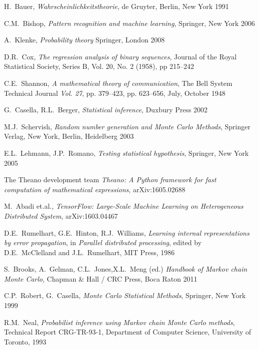 \documentclass[a4paper, draft]{report}
\numberwithin{section}{chapter}
\numberwithin{equation}{chapter}
\theoremstyle{own}
\theoremstyle{remark}
\begin{document}

\begin{thebibliography}{9}
	
H.~Bauer,
{\em Wahrscheinlichkeitstheorie},
de Gruyter, Berlin, New York 1991
	

C.M.~Bishop, 
{\em Pattern recognition and machine learning},
Springer, New York 2006

A.~Klenke,
{\em Probability theory}
Springer, London 2008


D.R.~Cox,
{\em The regression analysis of binary sequences},
Journal of the Royal Statistical Society, Series B, Vol. 20, No. 2 (1958), pp 215--242

C.E.~Shannon,
{\em A mathematical theory of communication}, 
The Bell System Technical Journal {\em Vol. 27}, pp. 379--423, pp. 623--656, July, October 1948


G.~Casella, R.L.~Berger,
{\em Statistical inference},
Duxbury Press 2002

M.J.~Schervish,
{\em Random number generation and Monte Carlo Methods},
Springer Verlag, New York, Berlin, Heidelberg 2003

E.L.~Lehmann, J.P.~Romano,
{\em Testing statistical hypothesis},
Springer, New York 2005

The Theano development team
{\em Theano: A Python framework for fast computation of mathematical expressions},
arXiv:1605.02688

M.~Abadi et.al.,
{\em TensorFlow: Large-Scale Machine Learning on Heterogeneous Distributed System},
arXiv:1603.04467

D.E.~Rumelhart, G.E.~Hinton, R.J.~Williams,
{\em Learning internal representations by error propagation}, in
{\em Parallel distributed processing}, edited by D.E.~McClelland and J.L.~Rumelhart, MIT Press, 1986


S.~Brooks, A.~Gelman, C.L.~Jones,X.L.~Meng (ed.)
{\em Handbook of Markov chain Monte Carlo},
Chapman \& Hall / CRC Press, Boca Raton 2011


C.P.~Robert, G.~Casella,
{\em Monte Carlo Statistical Methods},
Springer, New York 1999


R.M.~Neal, 
{\em Probabilist inference using Markov chain Monte Carlo methods}, 
Technical Report CRG-TR-93-1, Department of Computer Science, University of Toronto, 1993


\end{thebibliography}
\end{document}
